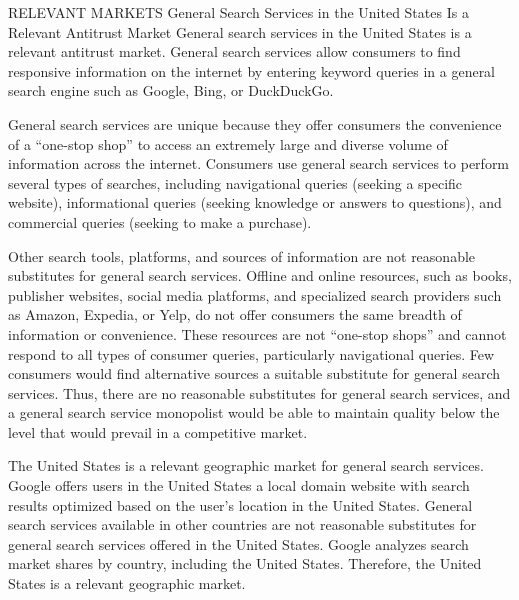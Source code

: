 \documentclass[11pt,b5paper]{scrartcl}
\begin{document}



RELEVANT MARKETS
General Search Services in the United States Is a Relevant Antitrust
Market
General search services in the United States is a relevant antitrust market. General
search services allow consumers to find responsive information on the internet by entering
keyword queries in a general search engine such as Google, Bing, or DuckDuckGo.


General search services are unique because they offer consumers the convenience
of a “one-stop shop” to access an extremely large and diverse volume of information across the
internet. Consumers use general search services to perform several types of searches, including
navigational queries (seeking a specific website), informational queries (seeking knowledge or
answers to questions), and commercial queries (seeking to make a purchase).


Other search tools, platforms, and sources of information are not reasonable
substitutes for general search services. Offline and online resources, such as books, publisher
websites, social media platforms, and specialized search providers such as Amazon, Expedia, or
Yelp, do not offer consumers the same breadth of information or convenience. These resources
are not “one-stop shops” and cannot respond to all types of consumer queries, particularly
navigational queries. Few consumers would find alternative sources a suitable substitute for
general search services. Thus, there are no reasonable substitutes for general search services, and
a general search service monopolist would be able to maintain quality below the level that would
prevail in a competitive market.


The United States is a relevant geographic market for general search services.
Google offers users in the United States a local domain website with search results optimized
based on the user’s location in the United States. General search services available in other
countries are not reasonable substitutes for general search services offered in the United States.
Google analyzes search market shares by country, including the United States. Therefore, the
United States is a relevant geographic market.

\end{document}
